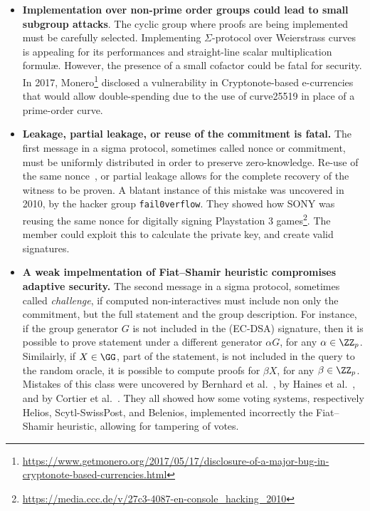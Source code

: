 \documentclass[runningheads]{llncs}
\begin{document}
\begin{itemize}
  \item \textbf{Implementation over non-prime order groups could lead to small subgroup attacks}. The cyclic group where proofs are being implemented must be carefully selected. Implementing $\Sigma$-protocol over Weierstrass curves is appealing for its performances and straight-line scalar multiplication formul\ae.
   However, the presence of a small cofactor could be fatal for security.
In 2017, Monero\footnote{\url{https://www.getmonero.org/2017/05/17/disclosure-of-a-major-bug-in-cryptonote-based-currencies.html}} disclosed a vulnerability in Cryptonote-based e-currencies that would allow double-spending
due to the use of curve25519 in place of a prime-order curve.
  \item \textbf{Leakage, partial leakage, or reuse of the commitment is fatal.}
  The first message in a sigma protocol, sometimes called nonce or commitment, must be uniformly distributed in order to preserve zero-knowledge. Re-use of the same nonce~\cite{XX}, or partial leakage allows for the complete recovery of the witness to be proven.
  A blatant instance of this mistake was uncovered in 2010, by the hacker group \texttt{fail0verflow}. They showed how SONY was reusing the same nonce for digitally signing Playstation 3 games\footnote{\url{https://media.ccc.de/v/27c3-4087-en-console_hacking_2010}}.  The member could exploit this to calculate the private key, and create valid signatures.

  \item \textbf{A weak impelmentation of Fiat--Shamir heuristic compromises adaptive security.} The second message in a sigma protocol, sometimes called \emph{challenge}, if computed non-interactives must include non only the commitment, but the full statement and the group description. For instance, if the group generator $G$ is not included in the (EC-DSA) signature, then it is possible to prove statement under a different generator $\alpha G$, for any $\alpha \in \ZZ_p$.
  Similairly, if $X \in \GG$, part of the statement, is not included in the query to the random oracle, it is possible to compute proofs for $\beta X$, for any $\beta \in \ZZ_p$.
  Mistakes of this class were uncovered by Bernhard et al.~\cite{AC:BerPerWar12}, by Haines et al.~\cite{SP:HLPT20}, and by Cortier et al.~\cite{cortier2020}.
  They all showed how some voting systems, respectively Helios,  Scytl-SwissPost, and Belenios,
  implemented incorrectly the Fiat--Shamir heuristic, allowing for tampering of votes.

\end{itemize}
\end{document}
